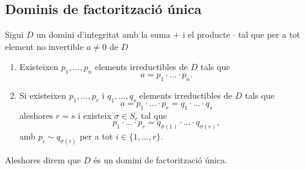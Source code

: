 \documentclass[../Apunts.tex]{subfiles}
\begin{document}
	\subsection{Dominis de factorització única}
	\begin{definition}
		\label{def:domini de factorització única}
		\label{def:DFU}
		Sigui \(D\) un domini d'integritat amb la suma \(+\) i el producte \(\cdot\) tal que per a tot element no invertible \(a\neq0\) de \(D\)
		\begin{enumerate}
			\item Existeixen \(p_{1},\dots,p_{n}\) elements irreductibles de \(D\) tals que
			\[a=p_{1}\cdot\ldots\cdot p_{n}.\]
			\item Si existeixen \(p_{1},\dots,p_{r}\) i \(q_{1},\dots,q_{s}\) elements irreductibles de \(D\) tals que
			\[a=p_{1}\cdot\ldots\cdot p_{r}=q_{1}\cdot\ldots\cdot q_{s}\]
			aleshores \(r=s\) i existeix \(\sigma\in S_{r}\) tal que
			\[p_{1}\cdot\ldots\cdot p_{r}=q_{\sigma(1)}\cdot\ldots\cdot q_{\sigma(r)},\]
			amb \(p_{i}\sim q_{\sigma(i)}\) per a tot \(i\in\{1,\dots,r\}\).
		\end{enumerate}
		Aleshores direm que \(D\) és un domini de factorització única.
	\end{definition}
\end{document}

